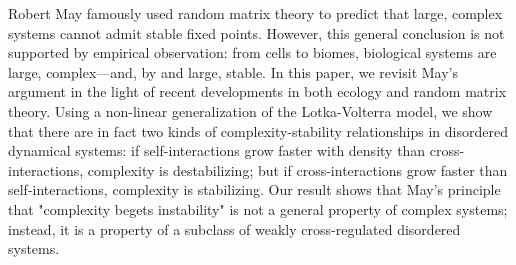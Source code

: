Robert May famously used random matrix theory to predict that large, complex systems cannot admit stable fixed points. 
However, this general conclusion is not supported by empirical observation: from cells to biomes, biological systems are large, complex---and, by and large, stable.
In this paper, we revisit May's argument in the light of recent developments in both ecology and random matrix theory. 
Using a non-linear generalization of the Lotka-Volterra model, we show that there are in fact two kinds of complexity-stability relationships in disordered dynamical systems: 
if self-interactions grow faster with density than cross-interactions, complexity is destabilizing; but if cross-interactions grow faster than self-interactions, complexity is stabilizing.
Our result shows that May's principle that "complexity begets instability" is not a general property of complex systems; instead, it is a property of a subclass of weakly cross-regulated disordered systems.